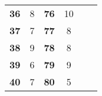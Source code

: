\documentclass{article}
\begin{document}
\begin{table}[]
\begin{tabular}{cccccc}
		\textbf{36}                     & 8                  & \textbf{76}                     & 10                 &                               &                               \\
		\textbf{37}                     & 7                  & \textbf{77}                     & 8                  &                               &                               \\
		\textbf{38}                     & 9                  & \textbf{78}                     & 8                  &                               &                               \\
		\textbf{39}                     & 6                  & \textbf{79}                     & 9                  &                               &                               \\
		\textbf{40}                     & 7                  & \textbf{80}                     & 5                  &                               &                              
	\end{tabular}
\end{table}
\end{document}
